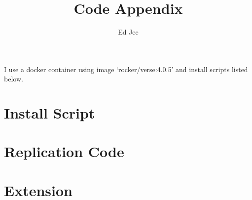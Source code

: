 \documentclass{article}
\author{Ed Jee}
\title{Code Appendix}
\begin{document}
    \maketitle

    I use a docker container using image `rocker/verse:4.0.5' and install 
    scripts listed below.
    \section{Install Script}

    
    \section{Replication Code} 
    


    \section{Extension} 
    
\end{document}
